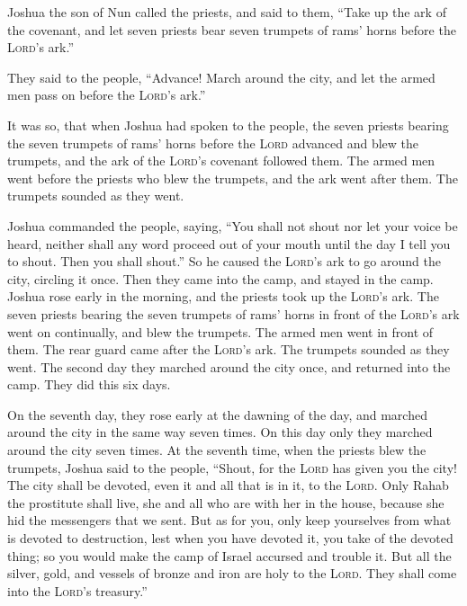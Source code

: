  Joshua the son of Nun called the priests, and said to
them, ``Take up the ark of the covenant, and let seven priests bear
seven trumpets of rams' horns before the \textsc{Lord}'s ark.''

 They said to the people, ``Advance! March around the
city, and let the armed men pass on before the \textsc{Lord}'s ark.''

 It was so, that when Joshua had spoken to the people, the
seven priests bearing the seven trumpets of rams' horns before the
\textsc{Lord} advanced and blew the trumpets, and the ark of the
\textsc{Lord}'s covenant followed them.  The armed men
went before the priests who blew the trumpets, and the ark went after
them. The trumpets sounded as they went.

 Joshua commanded the people, saying, ``You shall not
shout nor let your voice be heard, neither shall any word proceed out of
your mouth until the day I tell you to shout. Then you shall shout.''
 So he caused the \textsc{Lord}'s ark to go around the
city, circling it once. Then they came into the camp, and stayed in the
camp.  Joshua rose early in the morning, and the priests
took up the \textsc{Lord}'s ark.  The seven priests
bearing the seven trumpets of rams' horns in front of the
\textsc{Lord}'s ark went on continually, and blew the trumpets. The
armed men went in front of them. The rear guard came after the
\textsc{Lord}'s ark. The trumpets sounded as they went. 
The second day they marched around the city once, and returned into the
camp. They did this six days.

 On the seventh day, they rose early at the dawning of
the day, and marched around the city in the same way seven times. On
this day only they marched around the city seven times. 
At the seventh time, when the priests blew the trumpets, Joshua said to
the people, ``Shout, for the \textsc{Lord} has given you the city!
 The city shall be devoted, even it and all that is in
it, to the \textsc{Lord}. Only Rahab the prostitute shall live, she and
all who are with her in the house, because she hid the messengers that
we sent.  But as for you, only keep yourselves from what
is devoted to destruction, lest when you have devoted it, you take of
the devoted thing; so you would make the camp of Israel accursed and
trouble it.  But all the silver, gold, and vessels of
bronze and iron are holy to the \textsc{Lord}. They shall come into the
\textsc{Lord}'s treasury.''

